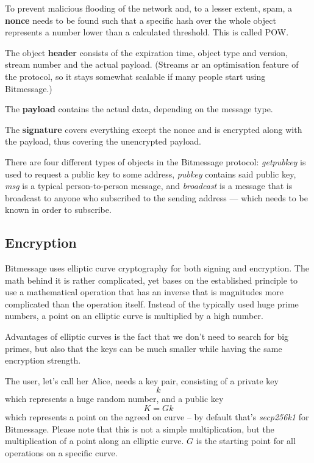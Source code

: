 \documentclass{bfh}
\begin{document}
  To prevent malicious flooding of the network and, to a lesser extent, spam, a \textbf{nonce} needs to be found such that a specific hash over the whole object represents a number lower than a calculated threshold. This is called \ac{POW}.

  The object \textbf{header} consists of the expiration time, object type and version, stream number and the actual payload. (Streams ar an optimisation feature of the protocol, so it stays somewhat scalable if many people start using Bitmessage.)
  
  The \textbf{payload} contains the actual data, depending on the message type.
  
  The \textbf{signature} covers everything except the nonce and is encrypted along with the payload, thus covering the unencrypted payload.

  There are four different types of objects in the Bitmessage protocol: \textit{getpubkey} is used to request a public key to some address, \textit{pubkey} contains said public key, \textit{msg} is a typical person-to-person message, and \textit{broadcast} is a message that is broadcast to anyone who subscribed to the sending address --- which needs to be known in order to subscribe.


  \subsection{Encryption}
  \label{subsec:encryption}
  Bitmessage uses elliptic curve cryptography for both signing and encryption. The math behind it is rather complicated, yet bases on the established principle to use a mathematical operation that has an inverse that is magnitudes more complicated than the operation itself. Instead of the typically used huge prime numbers, a point on an elliptic curve is multiplied by a high number.

  Advantages of elliptic curves is the fact that we don't need to search for big primes, but also that the keys can be much smaller while having the same encryption strength.

  The user, let's call her Alice, needs a key pair, consisting of a private key
$$k$$
which represents a huge random number, and a public key
$$K = G k$$
which represents a point on the agreed on curve -- by default that's \textit{secp256k1} for Bitmessage. Please note that this is not a simple multiplication, but the multiplication of a point along an elliptic curve. $G$ is the starting point for all operations on a specific curve.
\end{document}

